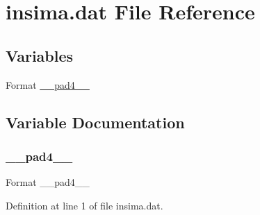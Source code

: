 \hypertarget{insima_8dat}{}\section{insima.\+dat File Reference}
\label{insima_8dat}
\subsection*{Variables}
\begin{DoxyCompactItemize}
\item 
Format \hyperlink{insima_8dat_a729cc061a9ce7fd15c1053aba75b410e}{\+\_\+\+\_\+pad4\+\_\+\+\_\+}
\end{DoxyCompactItemize}


\subsection{Variable Documentation}
\mbox{\label{insima_8dat_a729cc061a9ce7fd15c1053aba75b410e}} 
\subsubsection{\texorpdfstring{\+\_\+\+\_\+pad4\+\_\+\+\_\+}{\_\_pad4\_\_}}
{\footnotesize\ttfamily Format \+\_\+\+\_\+pad4\+\_\+\+\_\+}



Definition at line 1 of file insima.\+dat.

